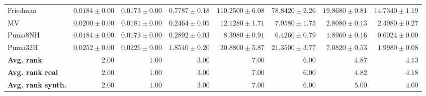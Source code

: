 \begin{table*}[!htbp]
{\begin{tabular}{lrrrrrrr}
		Friedman & $0.0184 \pm 0.00$ & $\mathbf{0.0173 \pm 0.00}$ & $0.7787 \pm 0.18$ & $110.2500 \pm 6.08$ & $78.8420 \pm 2.26$ & $19.8680 \pm 0.81$ & $14.7340 \pm 1.19$\\
		MV & $0.0200 \pm 0.00$ & $\mathbf{0.0181 \pm 0.00}$ & $0.2464 \pm 0.05$ & $12.1280 \pm 1.71$ & $7.9580 \pm 1.75$ & $2.8080 \pm 0.13$ & $2.4980 \pm 0.27$\\
		Puma8NH & $0.0184 \pm 0.00$ & $\mathbf{0.0173 \pm 0.00}$ & $0.2892 \pm 0.03$ & $8.3980 \pm 0.91$ & $6.4260 \pm 0.79$ & $1.8960 \pm 0.16$ & $0.6024 \pm 0.00$\\
		Puma32H & $0.0252 \pm 0.00$ & $\mathbf{0.0226 \pm 0.00}$ & $1.8540 \pm 0.20$ & $30.8800 \pm 5.87$ & $21.3500 \pm 3.77$ & $7.0820 \pm 0.53$ & $1.9980 \pm 0.08$\\
		\midrule
		\textbf{{Avg. rank}} & $2.00$ & $\mathbf{1.00}$ & $3.00$ & $7.00$ & $6.00$ & $4.87$ & $4.13$\\
		\textbf{{Avg. rank real}} & $2.00$ & $\mathbf{1.00}$ & $3.00$ & $7.00$ & $6.00$ & $4.82$ & $4.18$\\
		\textbf{{Avg. rank synth.}} & $2.00$ & $\mathbf{1.00}$ & $3.00$ & $7.00$ & $6.00$ & $5.00$ & $4.00$\\
		\bottomrule
	\end{tabular}}
\end{table*}
